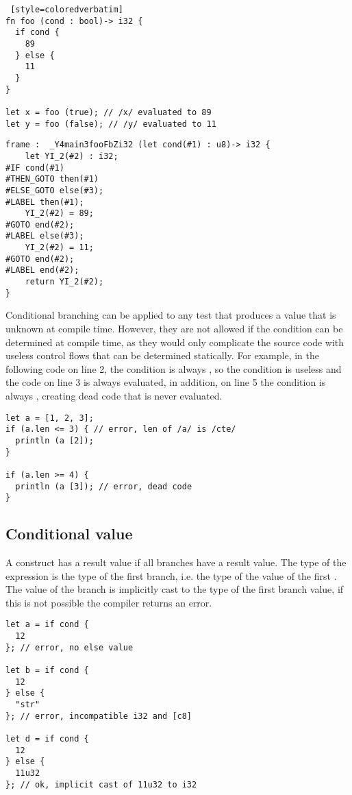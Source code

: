 \begin{lstlisting} [style=coloredverbatim]
fn foo (cond : bool)-> i32 {
  if cond {
    89
  } else {
    11
  }
}

let x = foo (true); // /x/ evaluated to 89
let y = foo (false); // /y/ evaluated to 11
\end{lstlisting}


\begin{lstlisting}[style=intermediateVerb, caption=Simple condition, label=lst:if_cond_simple]
frame :  _Y4main3fooFbZi32 (let cond(#1) : u8)-> i32 {
    let YI_2(#2) : i32;
#IF cond(#1)
#THEN_GOTO then(#1)
#ELSE_GOTO else(#3);
#LABEL then(#1);
    YI_2(#2) = 89;
#GOTO end(#2);
#LABEL else(#3);
    YI_2(#2) = 11;
#GOTO end(#2);
#LABEL end(#2);
    return YI_2(#2);
}
\end{lstlisting}



Conditional branching can be applied to any test that produces a 
value that is unknown at compile time. However, they are not allowed if the
condition can be determined at compile time, as they would only complicate the
source code with useless control flows that can be determined statically. For
example, in the following code on line 2, the condition is always ,
so the condition is useless and the code on line 3 is always evaluated, in
addition, on line 5 the condition is always , creating dead code
that is never evaluated.

\begin{lstlisting}[style=coloredverbatim]
let a = [1, 2, 3];
if (a.len <= 3) { // error, len of /a/ is /cte/
  println (a [2]);
}

if (a.len >= 4) {
  println (a [3]); // error, dead code
}
\end{lstlisting}

\subsection {Conditional value}
\label{sec:cond_value_type}

A  construct has a result value if all branches have a result value.
The type of the expression is the type of the first branch, i.e. the type of the
value of the first . The value of the  branch is
implicitly cast to the type of the first branch value, if this is not possible
the compiler returns an error.

\begin{lstlisting}[style=coloredverbatim]
let a = if cond {
  12
}; // error, no else value

let b = if cond {
  12
} else {
  "str"
}; // error, incompatible i32 and [c8]

let d = if cond {
  12
} else {
  11u32
}; // ok, implicit cast of 11u32 to i32
\end{lstlisting}

